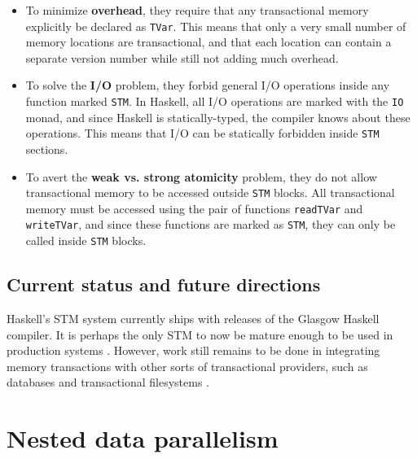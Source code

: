 \documentclass[a4paper]{acmtrans2m}
\begin{document}
\begin{itemize}
\item To minimize \textbf{overhead}, they require that any transactional memory
  explicitly be declared as \texttt{TVar}. This means that only a very small
  number of memory locations are transactional, and that each location can contain
  a separate version number while still not adding much overhead.
\item To solve the \textbf{I/O} problem, they forbid general I/O operations inside
  any function marked \texttt{STM}. In Haskell, all I/O operations are marked with
  the \texttt{IO} monad, and since Haskell is statically-typed, the compiler knows
  about these operations. This means that I/O can be statically forbidden inside
  \texttt{STM} sections.
\item To avert the \textbf{weak vs. strong atomicity} problem, they do not allow
  transactional memory to be accessed outside \texttt{STM} blocks. All
  transactional memory must be accessed using the pair of functions
  \texttt{readTVar} and \texttt{writeTVar}, and since these functions are marked
  as \texttt{STM}, they can only be called inside \texttt{STM} blocks.
\end{itemize}

\subsection{Current status and future directions}

Haskell's STM system currently ships with releases of the Glasgow Haskell compiler.
It is perhaps the only STM to now be mature enough to be used in production systems
\cite{Stewart:2009}. However, work still remains to be done in integrating memory
transactions with other sorts of transactional providers, such as databases and
transactional filesystems \cite{SPJ:2006}.

\section{Nested data parallelism}
\label{sec:dph}



\end{document}

